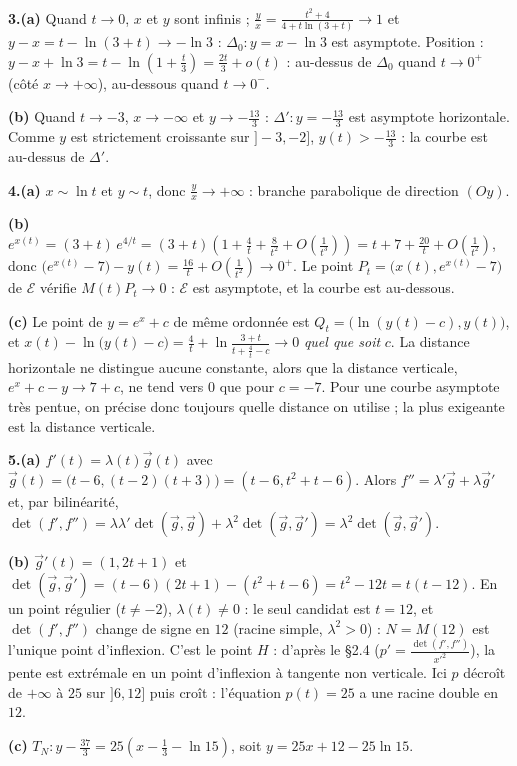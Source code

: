\documentclass[a4paper,11pt]{article}
\numberwithin{equation}{section}
\numberwithin{figure}{section}
\numberwithin{table}{section}
\theoremstyle{enonce}
\theoremstyle{exemple}
\theoremstyle{remarque}
\newcommand{\ve}[1]{\vec{#1}}
\begin{document}
\textbf{3.(a)} Quand $t\to0$, $x$ et $y$ sont infinis ; $\frac yx=\frac{t^2+4}{4+t\ln(3+t)}\to1$ et
$y-x=t-\ln(3+t)\to-\ln3$ : $\Delta_0:y=x-\ln3$ est asymptote. Position :
$y-x+\ln3=t-\ln\left(1+\frac t3\right)=\frac{2t}3+o(t)$ : au-dessus de $\Delta_0$ quand $t\to0^+$ (côté $x\to+\infty$),
au-dessous quand $t\to0^-$.

\textbf{(b)} Quand $t\to-3$, $x\to-\infty$ et $y\to-\frac{13}3$ : $\Delta':y=-\frac{13}3$ est asymptote horizontale. Comme $y$
est strictement croissante sur $]-3,-2]$, $y(t)>-\frac{13}3$ : la courbe est au-dessus de $\Delta'$.

\textbf{4.(a)} $x\sim\ln t$ et $y\sim t$, donc $\frac yx\to+\infty$ : branche parabolique de direction $(Oy)$.

\textbf{(b)} $e^{x(t)}=(3+t)\,e^{4/t}=(3+t)\left(1+\frac4t+\frac8{t^2}+O\!\left(\frac1{t^3}\right)\right)=t+7+\frac{20}t+O\!\left(\frac1{t^2}\right)$,
donc $\big(e^{x(t)}-7\big)-y(t)=\frac{16}t+O\!\left(\frac1{t^2}\right)\to0^+$. Le point $P_t=\big(x(t),e^{x(t)}-7\big)$ de
$\mathcal E$ vérifie $M(t)P_t\to0$ : $\mathcal E$ est asymptote, et la courbe est au-dessous.

\textbf{(c)} Le point de $y=e^x+c$ de même ordonnée est $Q_t=\big(\ln(y(t)-c),y(t)\big)$, et
$x(t)-\ln\big(y(t)-c\big)=\frac4t+\ln\frac{3+t}{t+\frac4t-c}\to0$ \emph{quel que soit} $c$. La distance horizontale ne
distingue aucune constante, alors que la distance verticale, $e^x+c-y\to7+c$, ne tend vers $0$ que pour $c=-7$. Pour une courbe
asymptote très pentue, on précise donc toujours quelle distance on utilise ; la plus exigeante est la distance verticale.

\textbf{5.(a)} $f'(t)=\lambda(t)\ve g(t)$ avec $\ve g(t)=\big(t-6,(t-2)(t+3)\big)=(t-6,t^2+t-6)$. Alors
$f''=\lambda'\ve g+\lambda\ve g'$ et, par bilinéarité, $\det(f',f'')=\lambda\lambda'\det(\ve g,\ve g)+\lambda^2\det(\ve g,\ve g')=\lambda^2\det(\ve g,\ve g')$.

\textbf{(b)} $\ve g'(t)=(1,2t+1)$ et $\det(\ve g,\ve g')=(t-6)(2t+1)-(t^2+t-6)=t^2-12t=t(t-12)$. En un point régulier
($t\neq-2$), $\lambda(t)\neq0$ : le seul candidat est $t=12$, et $\det(f',f'')$ change de signe en $12$ (racine simple, $\lambda^2>0$) :
$N=M(12)$ est l'unique point d'inflexion. C'est le point $H$ : d'après le \S2.4 ($p'=\frac{\det(f',f'')}{x'^2}$), la pente est extrémale en un
point d'inflexion à tangente non verticale. Ici $p$ décroît de $+\infty$ à $25$ sur $]6,12]$ puis croît : l'équation $p(t)=25$ a une
racine double en $12$.

\textbf{(c)} $T_N:y-\frac{37}3=25\left(x-\frac13-\ln15\right)$, soit $y=25x+12-25\ln15$.
\end{document}
